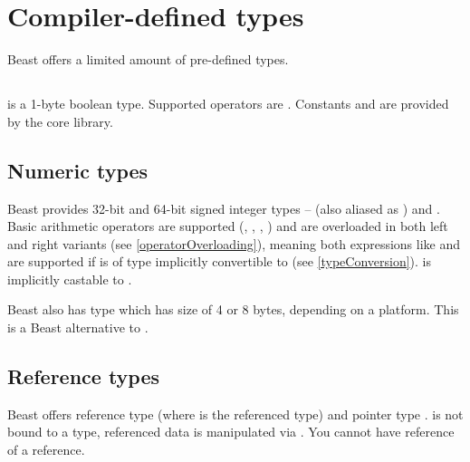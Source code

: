 \section{Compiler-defined types}
Beast offers a limited amount of pre-defined types.

\subsection{}
 is a 1-byte boolean type. Supported operators are \inlineCode{&& || == !=}. Constants  and  are provided by the core library.

\subsection{Numeric types}
Beast provides 32-bit and 64-bit signed integer types --  (also aliased as ) and . Basic arithmetic operators are supported (\inlineCode{+}, \inlineCode{-}, \inlineCode{*}, \inlineCode{/}) and are overloaded in both left and right variants (see \autoref{operatorOverloading}), meaning both expressions like  and  are supported if  is of type implicitly convertible to  (see \autoref{typeConversion}).  is implicitly castable to .

Beast also has type  which has size of 4 or 8 bytes, depending on a platform. This is a Beast alternative to .

\subsection{Reference types}
Beast offers reference type  (where  is the referenced type) and pointer type .  is not bound to a type, referenced data is manipulated via .  You cannot have reference of a reference.

